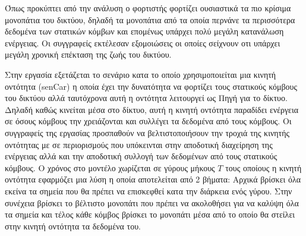 Όπως προκύπτει από την ανάλυση ο φορτιστής φορτίζει ουσιαστικά τα πιο κρίσιμα μονοπάτια του δικτύου, δηλαδή τα μονοπάτια από τα οποία περνάνε τα περισσότερα δεδομένα
των στατικών κόμβων και επομένως υπάρχει πολύ μεγάλη κατανάλωση ενέργειας. Οι συγγραφείς εκτέλεσαν εξομοιώσεις οι οποίες σείχνουν οτι υπάρχει μεγάλη χρονική επέκταση
της ζωής του δικτύου.


Στην εργασία \cite{yuanyuan_joint} εξετάζεται το σενάριο κατα το οποίο χρησιμοποιείται μια κινητή οντότητα (senCar) η οποία έχει την δυνατότητα να φορτίζει τους
στατικούς κόμβους του δικτύου αλλά ταυτόχρονα αυτή η οντότητα λειτουργεί ως Πηγή για το δίκτυο. Δηλαδή καθώς κινείται μέσα στο δίκτυο, αυτή η κινητή οντότητα
παραδίδει ενέργεια σε όσους κόμβους την χρειάζονται και συλλέγει τα δεδομένα από τους κόμβους. Οι συγγραφείς της εργασίας προσπαθούν να βελτιστοποιήσουν την τροχιά
της κινητής οντότητας με σε περιορισμούς που υπόκεινται στην αποδοτική διαχείρηση της ενέργειας αλλά και την αποδοτική συλλογή των δεδομένων από τους στατικούς
κόμβους. Ο χρόνος στο μοντέλο χωρίζεται σε γύρους μήκους $T$ τους οποίους η κινητή οντότητα εφαρμόζει μια λύση η οποία αποτελείται από 2 βήματα: Αρχικά βρίσκει όλα
εκείνα τα σημεία που θα πρέπει να επισκεφθεί κατα την διάρκεια ενός γύρου. Στην συνέχεια βρίσκει το βέλτιστο μονοπάτι που πρέπει να ακολοθήσει για να καλύψη όλα τα
σημεία και τέλος κάθε κόμβος βρίσκει το μονοπάτι μέσα από το οποίο θα στείλει στην κινητή οντότητα τα δεδομένα του.

